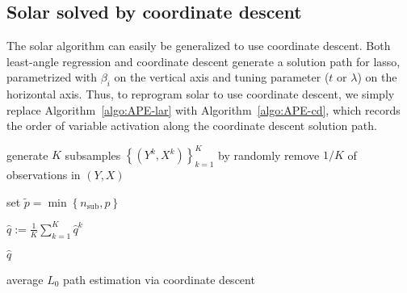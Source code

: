 \documentclass[11pt,review,authoryear]{elsarticle}
\begin{document}
\subsection{Solar solved by coordinate descent}

The solar algorithm can easily be generalized to use coordinate descent. Both least-angle regression and coordinate descent generate a solution path for lasso, parametrized with $\beta_i$ on the vertical axis and tuning parameter ($t$ or $\lambda$) on the horizontal axis. Thus, to reprogram solar to use coordinate descent, we simply replace Algorithm~\ref{algo:APE-lar} with Algorithm~\ref{algo:APE-cd}, which records the order of variable activation along the coordinate descent solution path.

\smallskip
\begin{algorithm}[h]


  \smallskip

  generate $K$ subsamples $\left\{ \left( Y^k, X^k \right) \right\}^{K}_{k=1}$ by randomly remove $1/K$ of observations in $\left( Y, X \right)$\;

  set $\widetilde{p} = \min\left\{ n_{\mathrm{sub}}, p \right\}$ \;


  $\widehat{q} := \frac{1}{K} \sum_{k=1}^{K} \widehat{q}^k$\; 

  \Return $\widehat{q}$

\caption{average $L_0$ path estimation via coordinate descent \label{algo:APE-cd}}

\end{algorithm}
\end{document}
